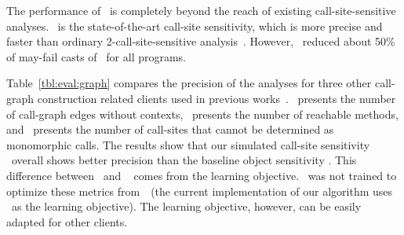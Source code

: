 The performance of \ours~is completely beyond the reach of
existing call-site-sensitive analyses. 
\onecallHT~is the state-of-the-art call-site sensitivity,
which is more precise and faster than ordinary 2-call-site-sensitive analysis~\cite{JeJeOh18}.
However, \ours~reduced about 50\% of may-fail casts of \onecallHT~for all programs.

Table~\ref{tbl:eval:graph} compares the precision of the analyses for three other call-graph construction related clients  used in previous works~\cite{Li2018a,Li2018b,Tan2017}. \callgraphedges~presents the number of call-graph edges without contexts, \reachableMethods~presents the number of reachable methods, and \polycalls~presents the number of call-sites that cannot be determined as monomorphic calls. The results show that our simulated call-site sensitivity \oursim~overall shows better precision than the baseline object sensitivity \onecallHT. 
This difference between \oursim~and \ours~ comes from the learning objective. \ours~was not trained to optimize these metrics from~\oursim~(the current implementation of our algorithm uses \failcasts~as the learning objective).
The learning objective, however, can be easily adapted for other clients. 







